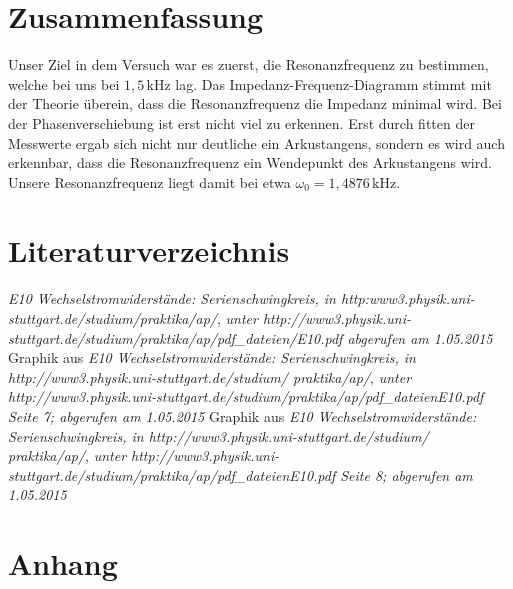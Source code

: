 \documentclass[fontsize=12pt]{scrartcl}
\begin{document}
\section{Zusammenfassung}

Unser Ziel in dem Versuch war es zuerst, die Resonanzfrequenz zu bestimmen, welche bei uns bei $1,5\,$kHz lag. Das Impedanz-Frequenz-Diagramm stimmt 
mit der Theorie überein, dass die Resonanzfrequenz die Impedanz minimal wird. Bei der Phasenverschiebung ist erst nicht viel zu erkennen. Erst durch fitten 
der Messwerte ergab sich nicht nur deutliche ein Arkustangens, sondern es wird auch erkennbar, dass die Resonanzfrequenz ein Wendepunkt des 
Arkustangens wird. Unsere Resonanzfrequenz liegt damit bei etwa $\omega_0=1,4876$\,kHz.

\section{Literaturverzeichnis}

\begin{thebibliography}{xxxxxxxx}
			\textit{\glqq E10 Wechselstromwiderstände: Serienschwingkreis\grqq , in 
								http:www3.physik.uni-stuttgart.de/studium/praktika/ap/},\textit{ unter 
								http://www3.physik.uni-stuttgart.de/studium/praktika/ap/pdf\_dateien/E10.pdf abgerufen am 1.05.2015}
     	Graphik aus \textit{\glqq E10 Wechselstromwiderstände: Serienschwingkreis\grqq , in 	http://www3.physik.uni-stuttgart.de/studium/
   								praktika/ap/}, \textit{ unter 	http://www3.physik.uni-stuttgart.de/studium/praktika/ap/pdf\_dateienE10.pdf  Seite 7; abgerufen am 1.05.2015} 
	  	Graphik aus \textit{\glqq E10 Wechselstromwiderstände: Serienschwingkreis\grqq , in 	http://www3.physik.uni-stuttgart.de/studium/
   								praktika/ap/}, \textit{ unter 	http://www3.physik.uni-stuttgart.de/studium/praktika/ap/pdf\_dateienE10.pdf Seite 8; abgerufen am 1.05.2015}

\end{thebibliography}

\section{Anhang}
\end{document}
